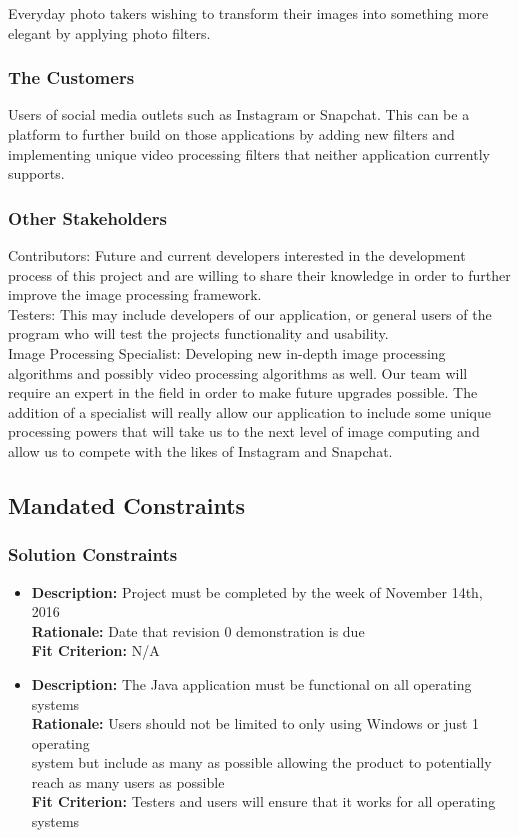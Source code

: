 \documentclass[12pt, titlepage]{article}
\begin{document}
Everyday photo takers wishing to transform their images into something more elegant by applying photo filters. 

\subsubsection{The Customers}

Users of social media outlets such as Instagram or Snapchat. This can be a platform to further build on those applications by adding new filters and implementing unique video processing filters that neither application currently supports. 

\subsubsection{Other Stakeholders}


Contributors: Future and current developers interested in the development process of this project and are willing to share their knowledge in order to further improve the image processing framework.\\

Testers: This may include developers of our application, or general users of the program who will test the projects functionality and usability.\\

Image Processing Specialist: Developing new in-depth image processing algorithms and possibly video processing algorithms as well. Our team will require an expert in the field in order to make future upgrades possible. The addition of a specialist will really allow our application to include some unique processing powers that will take us to the next level of image computing and allow us to compete with the likes of Instagram and Snapchat.


\subsection{Mandated Constraints}

\subsubsection{Solution Constraints}
\begin{itemize}
  \item {\bf Description:} Project must be completed by the week of November 14th, 2016\\
        {\bf Rationale:} Date that revision 0 demonstration is due\\
        {\bf Fit Criterion:} N/A \\
  \item {\bf Description:} The Java application must be functional on all operating systems\\
        {\bf Rationale:} Users should not be limited to only using Windows or just 1 operating\\ system but include as many as possible allowing the product to potentially reach as many users as possible\\
        {\bf Fit Criterion:} Testers and users will ensure that it works for all operating systems
  \end{itemize}
  
\end{document}
